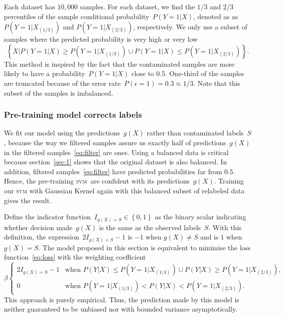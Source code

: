 \documentclass[12pt]{article} %
\newcommand{\svm}{\textsc{svm}}
\begin{document}
Each dataset has $10,000$ samples.
For each dataset, we find the $1/3$ and $2/3$ percentiles of the sample conditional probability~$P(Y=1|X)$, denoted as as $P(Y=1|X_{(1/3)})$ and $P(Y=1|X_{(2/3)})$, respectively.
We only use a subset of samples where the predicted probability is very high or very low
\begin{equation}\label{eq:filter}
\left\{X|P(Y=1|X)\geq P(Y=1|X_{(1/3)}) \cup P(Y=1|X)\leq P(Y=1|X_{(2/3)}) \right\}.
\end{equation}
This method is inspired by the fact that the contaminated samples are more likely to have a probability~$P(Y=1|X)$ close to $0.5$. One-third of the samples are truncated because of the error rate~$P(\epsilon=1)=0.3\approx 1/3$. Note that this subset of the samples is imbalanced.

\subsubsection{Pre-training model corrects labels}
We fit our model using the predictions~$g(X)$ rather than contaminated labels~$S$, because the way we filtered samples  assure us exactly half of predictions~$g(X)$ in the filtered samples~\eqref{eq:filter}  are ones.
Using a balanced data is critical because section~\ref{sec:1} shows that the original dataset is also balanced. In addition, filtered samples~\eqref{eq:filter} have  predicted probabilities far from $0.5$. Hence, the pre-training \svm\ are confident with its predictions~$g(X)$.
Training our \textsc{svm} with Gaussian Kernel again with this balanced subset of relabeled data gives the result.

Define the indicator function~$I_{g(X)=S} \in \left\{0,1\right\}$ as the binary scalar indicating whether decision made~$g(X)$ is the same as the observed labels~$S$. With this definition, the expression~$2I_{g(X)=S}-1$ is $-1$ when $g(X)\neq S$ and is $1$ when $g(X)=S$.  The model proposed in this section is equivalent to minimise the loss function~\eqref{eq:loss} with the weighting coefficient
\begin{equation*}
\beta\begin{cases}
2I_{g(X)=S}-1 & \text{when }P({Y}|X)\leq P(Y=1|X_{(1/3)}) \cup P({Y}|X)\geq P(Y=1|X_{(2/3)}),\\
0 & \text{when }P(Y=1|X_{(1/3)})<P({Y}|X)<P(Y=1|X_{(2/3)}).
\end{cases}
\end{equation*}
This approach is purely empirical. Thus, the prediction made by this model is neither guaranteed to be unbiased nor with bounded variance asymptotically.
\end{document}
